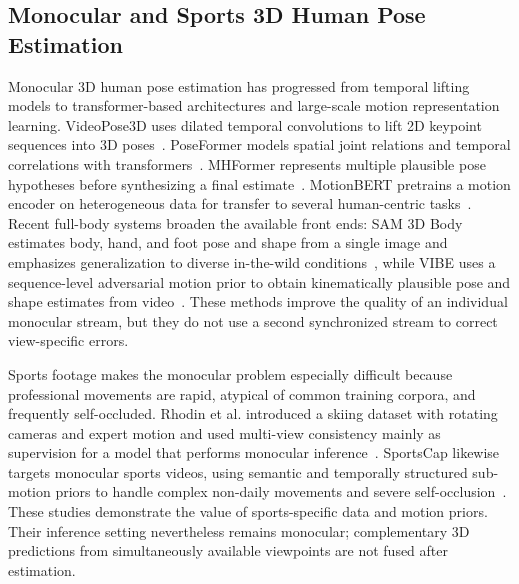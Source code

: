 \documentclass[preprint,12pt]{elsarticle}
\begin{document}
\subsection{Monocular and Sports 3D Human Pose Estimation}
Monocular 3D human pose estimation has progressed from temporal lifting models to transformer-based architectures and large-scale motion representation learning. VideoPose3D uses dilated temporal convolutions to lift 2D keypoint sequences into 3D poses~\cite{pavllo2019videopose3d}. PoseFormer models spatial joint relations and temporal correlations with transformers~\cite{zheng2021poseformer}. MHFormer represents multiple plausible pose hypotheses before synthesizing a final estimate~\cite{li2022mhformer}. MotionBERT pretrains a motion encoder on heterogeneous data for transfer to several human-centric tasks~\cite{zhu2023motionbert}. Recent full-body systems broaden the available front ends: SAM 3D Body estimates body, hand, and foot pose and shape from a single image and emphasizes generalization to diverse in-the-wild conditions~\cite{yang2026sam}, while VIBE uses a sequence-level adversarial motion prior to obtain kinematically plausible pose and shape estimates from video~\cite{kocabas2020vibe}. These methods improve the quality of an individual monocular stream, but they do not use a second synchronized stream to correct view-specific errors.

Sports footage makes the monocular problem especially difficult because professional movements are rapid, atypical of common training corpora, and frequently self-occluded. Rhodin et al. introduced a skiing dataset with rotating cameras and expert motion and used multi-view consistency mainly as supervision for a model that performs monocular inference~\cite{rhodin2018learning}. SportsCap likewise targets monocular sports videos, using semantic and temporally structured sub-motion priors to handle complex non-daily movements and severe self-occlusion~\cite{chen2021sportscap}. These studies demonstrate the value of sports-specific data and motion priors. Their inference setting nevertheless remains monocular; complementary 3D predictions from simultaneously available viewpoints are not fused after estimation.
\end{document}
